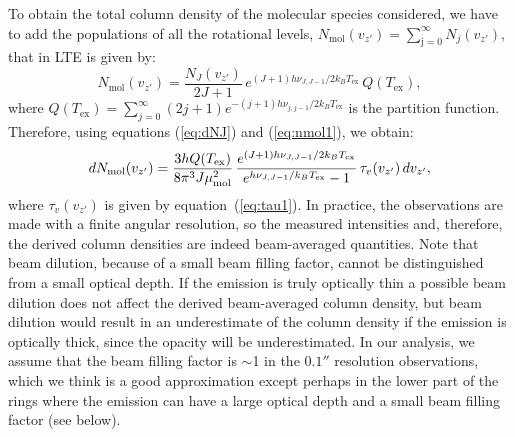 \documentclass[12pt]{mythesis}
\begin{document}
To obtain the total column density of the molecular species considered, we have to add the populations of all the rotational levels, $N_\mathrm{mol}(v_{z'})=\sum^\infty_{\mathrm{j=0}}N_j(v_{z'})$, that in LTE is given by:
\begin{equation}
	N_\mathrm{mol}(v_{z'}) = \frac{N_J(v_{z'})}{2J+1}\, e^{(J+1)h\nu_{J,J-1}/2k_B T_\mathrm{ex}}\, Q(T_\mathrm{ex}),
\label{eq:nmol1}
\end{equation}
where $Q(T_\mathrm{ex})=\sum^\infty_{j=0}\left(2j +1\right) e^{-(j+1) h \nu_{j,j-1}/2k_B T_\mathrm{ex}}$ is the partition function. Therefore, using equations
 (\ref{eq:dNJ}) and (\ref{eq:nmol1}), we obtain: 
\begin{equation}
  d N_\mathrm{mol}(v_{z'}) = 
\frac{3 h Q(T_\mathrm{ex})}{8 \pi^3 J \mu_{\rm mol}^2}\,
\frac{e^{(J+1)h\nu_{J,J-1}/2k_B T_\mathrm{ex}}}{e^{h\nu_{J,J-1}/k_B T_\mathrm{ex}}-1}\,
\tau_v (v_{z'}) \, dv_{z'}, 
\label{eq:nmol2}
\end{equation}
where $\tau_v (v_{z'})$ is given by equation~(\ref{eq:tau1}). 
 In practice, the observations are made with a finite angular resolution, so the measured intensities and, therefore, the derived column densities are indeed beam-averaged quantities. 
Note that beam dilution, because of a small beam filling factor, cannot be distinguished from a small optical depth.
If the emission is truly optically thin a possible beam dilution does not affect the derived beam-averaged column density, but beam dilution would result in an underestimate of the column density if the emission is optically thick, since the opacity will be underestimated. In our analysis, we assume that the beam filling factor is $\sim$1 in the $0.1''$ resolution observations, which we think is a good approximation except perhaps in the lower part of the rings where the emission can have a large optical depth and a small beam filling factor (see below).

\end{document}
